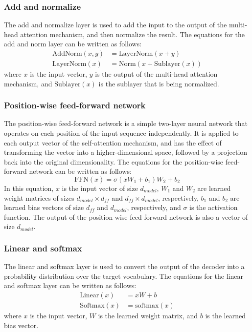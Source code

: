 \documentclass[a4paper, noexaminfo]{sapthesis}
\begin{document}
\subsubsection{Add and normalize}
The add and normalize layer is used to add the input to the output of the
  multi-head attention mechanism, and then normalize the result. The
    equations for the add and norm layer can be written as follows:
    \begin{align*}
      \text{AddNorm}(x,y) &= \text{LayerNorm}(x+y) \\
      \text{LayerNorm}(x) &= \text{Norm}(x+\text{Sublayer}(x))
      \end{align*}
where $x$ is the input vector, $y$ is the output of the multi-head
  attention mechanism, and $\text{Sublayer}(x)$ is the sublayer that
    is being normalized.
\subsubsection{Position-wise feed-forward network}
The position-wise feed-forward network is a simple two-layer neural 
network that operates on each position of the input sequence 
independently. It is applied to each output vector of the self-attention
 mechanism, and has the effect of transforming the vector into a 
 higher-dimensional space, followed by a projection back into the
  original dimensionality.\newline
The equations for the position-wise feed-forward network can be written
 as follows:
 \begin{equation}
   \text{FFN}(x) = \sigma(xW_1+b_1)W_2+b_2
   \end{equation}
 In this equation, $x$ is the input vector of size $d_{model}$,
  $W_1$ and $W_2$ are learned weight matrices of sizes 
  $d_{model}\times d_{ff}$ and $d_{ff}\times d_{model}$,
respectively, $b_1$ and $b_2$ are learned bias vectors of
size $d_{ff}$ and $d_{model}$, respectively, and $\sigma$ is the
 activation function. The output of the
position-wise feed-forward network is also a vector of size $d_{model}$.
\subsubsection{Linear and softmax}
The linear and softmax layer is used to convert the output of the decoder
 into a probability distribution over the target vocabulary. The equations for the
   linear and softmax layer can be written as follows:
   \begin{align*}
     \text{Linear}(x) &= xW+b \\
     \text{Softmax}(x) &= \text{softmax}(x)
     \end{align*}
where $x$ is the input vector, $W$ is the learned weight matrix, and $b$
  is the learned bias vector.
\end{document}
